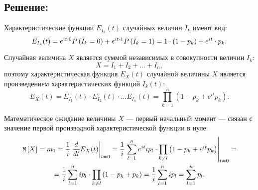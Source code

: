 \subsection*{Решение:}

Характеристические функции $E_{I_k}(t)$ случайных величин $I_k$ имеют вид:
\begin{equation}
    E_{I_k}(t)
    = e^{it \cdot 0} P \left ( I_k = 0 \right ) + e^{it \cdot 1} P \left ( I_k = 1 \right )
    = 1 \cdot ( 1 - p_k ) + e^{it} \cdot p_k .
\end{equation}

Случайная величина $X$ является суммой независимых в совокупности величин $I_k$:
\begin{equation}
    X = I_1 + I_2 + \dots + I_n,
\end{equation}
поэтому характеристическая функция $E_X(t)$ случайной величины $X$ является произведением характеристических функций $I_k(t)$:
\begin{equation}
    E_X(t)
    = E_{I_1}(t) \cdot E_{I_2}(t) \cdot \dots E_{I_n}(t)
    = \prod_{k=1}^n \left ( 1 - p_k + e^{it} p_k \right ).
\end{equation}

Математическое ожидание величины $X$ --- первый начальный момент --- связан с значение первой производной характеристической функции в нуле:
\begin{multline}
    \mathtt{M} \left [ X \right ] = m_1
    = \frac{1}{i} \left . \frac{d}{dt} E_X(t) \right |_{t=0}
    = \frac{1}{i} \left . \sum_{l=1}^n e^{it} i p_l \cdot \prod_{k \neq l} \left ( 1 - p_k + e^{it} p_k \right ) \right |_{t=0} = \\
    = \frac{1}{i}  \sum_{l=1}^n i p_l \cdot \prod_{k \neq l} \left ( 1 - p_k + p_k \right )
    = \frac{1}{i} \sum_{l=1}^n i p_l
    = \sum_{l=1}^n p_l .
\end{multline}

